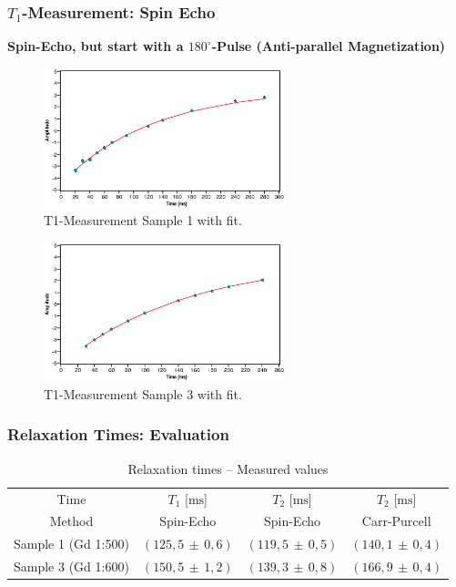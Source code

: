 \documentclass[aspectratio=169]{beamer}
\newcommand{\err}[2]{( #1 \, \pm \, #2 )}
\begin{document}
\begin{frame}
	\frametitle{$T_1$-Measurement: Spin Echo}
	\textbf{Spin-Echo, but start with a $180^\circ$-Pulse (Anti-parallel Magnetization)}
	\pause
	\begin{minipage}[t]{0.45\textwidth}
		\centering
		\begin{figure}
			\includegraphics[width=70mm]{./Resources/t1_meas_p1.eps}
			\caption{T1-Measurement Sample 1 with fit.}
			\label{fig:t1_p1}
		\end{figure}
	\end{minipage}
	\hfill
	\begin{minipage}[t]{0.45\textwidth}
		\centering
		\begin{figure}
			\includegraphics[width=70mm]{./Resources/t1_meas_p3.eps}
			\caption{T1-Measurement Sample 3 with fit.}
			\label{fig:t1_p3}
		\end{figure}
	\end{minipage}
\end{frame}

\begin{frame}
	\frametitle{Relaxation Times: Evaluation}
	\begin{table}[H] 
		\centering
		\caption{Relaxation times -- Measured values}
		\label{tab:relaxtimes}
		\begin{tabular}{cccc}
			\toprule
			Time & $T_1$ [$\mathrm{ms}$] & $T_2$ [$\mathrm{ms}$] & $T_2$ [$\mathrm{ms}$]\\
			Method & Spin-Echo & Spin-Echo & Carr-Purcell\\
			\midrule
			Sample 1 (Gd 1:500)& $\err{125,5}{0,6}$ & $\err{119,5}{0,5}$ & $\err{140,1}{0,4}$\\
			Sample 3 (Gd 1:600)& $\err{150,5}{1,2}$ & $\err{139,3}{0,8}$ & $\err{166,9}{0,4}$\\
			\bottomrule
		\end{tabular}
	\end{table}
	
\end{frame}
\end{document}

